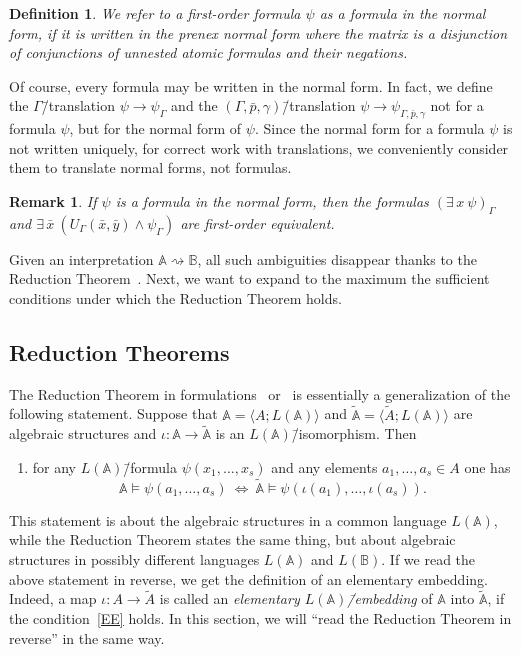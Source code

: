 \documentclass[12pt]{article}
\newtheorem{remark}{Remark}
\newtheorem{definition}{Definition}
\theoremstyle{definition}
\def\MA{{\mathbb{A}}}
\def\MB{{\mathbb{B}}}
\newcommand{\nsA}{\widetilde{\mathbb A}}
\newcommand{\nsuA}{\widetilde{A}}
\begin{document}
\begin{definition}
We refer to a first-order formula $\psi$ as a {\em formula in the normal form}, if it is written in the prenex normal form where the matrix is a disjunction of conjunctions of unnested atomic formulas and their negations.
\end{definition}

Of course, every formula may be written in the normal form. In fact, we define the $\Gamma$\=/translation $\psi\to\psi_\Gamma$ and the $(\Gamma,\bar p,\gamma)$\=/translation $\psi\to\psi_{\Gamma,\bar p,\gamma}$ not for a formula $\psi$, but for the normal form of $\psi$. Since the normal form for a formula $\psi$ is not written uniquely, for correct work with translations, we conveniently consider them to translate normal forms, not formulas. 

\begin{remark}\label{remar:norm_form}
If $\psi$ is a formula in the normal form, then the formulas $(\exists\,x\:\psi)_\Gamma$ and $\exists\,\bar x \:(U_\Gamma(\bar x,\bar y)\wedge \psi_\Gamma)$ are first-order equivalent.
\end{remark}

Given an interpretation $\MA\rightsquigarrow\MB$, all such ambiguities disappear thanks to the Reduction Theorem~\cite[Corollary~3]{Th_int1}. Next, we want to expand to the maximum the sufficient conditions under which the Reduction Theorem holds.

\subsection{Reduction Theorems}\label{sec:IRT}

The Reduction Theorem in formulations~\cite[Theorem~5.3.2]{Hodges} or~\cite[Theorem~1]{Th_int1} is essentially a generalization of the following statement. Suppose that $\MA=\langle A; L(\MA)\rangle$ and $\nsA=\langle \nsuA; L(\MA)\rangle$ are algebraic structures and $\iota\colon \MA\to\nsA$ is an $L(\MA)$\=/isomorphism. Then
\begin{enumerate}[label=(EE)]
\item\label{EE} for any $L(\MA)$\=/formula $\psi(x_1,\ldots,x_s)$ and any elements $a_1,\ldots,a_s\in A$ one has 
$$
\MA\models\psi(a_1,\ldots,a_s) \ \iff \ \nsA\models \psi(\iota(a_1),\ldots,\iota(a_s)).
$$
\end{enumerate}
This statement is about the algebraic structures in a common language $L(\MA)$, while the Reduction Theorem states the same thing, but about algebraic structures in possibly different languages $L(\MA)$ and $L(\MB)$. If we read the above statement in reverse, we get the definition of an elementary embedding. Indeed, a map $\iota\colon A\to\nsuA$ is called an {\em elementary $L(\MA)$\=/embedding} of $\MA$ into $\nsA$, if the condition~\ref{EE} holds. In this section, we will ``read the Reduction Theorem in reverse'' in the same way.
\end{document}
